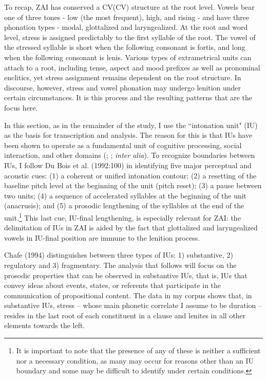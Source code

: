 To recap, ZAI has conserved a CV(CV) structure at the root level. Vowels bear one of three tones - low (the most frequent), high, and rising - and have three phonation types - modal, glottalized and laryngealized. At the root and word level, stress is assigned predictably to the first syllable of the root. The vowel of the stressed syllable is short when the following consonant is fortis, and long when the following consonant is lenis. Various types of extrametrical units can attach to a root, including tense, aspect and mood prefixes as well as pronominal enclitics, yet stress assignment remains dependent on the root structure. In discourse, however, stress and vowel phonation may undergo lenition under certain circumstances. It is this process and the resulting patterns that are the focus here.  

In this section, as in the remainder of the study, I use the ``intonation unit" (IU) \citep{chafe1994} as the basis for transcription and analysis. The reason for this is that IUs have been shown to operate as a fundamental unit of cognitive processing, social interaction, and other domains (\citealt{chafe1994}; \citealt{dubois1993}; \textit{inter alia}). To recognize boundaries between IUs, I follow Du Bois et al. (1992:100) in identifying five major perceptual and acoustic cues: (1) a coherent or unified intonation contour; (2) a resetting of the baseline pitch level at the beginning of the unit (pitch reset); (3) a pause between two units; (4) a sequence of accelerated syllables at the beginning of the unit (anacrusis); and (5) a prosodic lengthening of the syllables at the end of the unit.\footnote{It is important to note that the presence of any of these is neither a sufficient nor a necessary condition, as many may occur for reasons other than an IU boundary and some may be difficult to identify under certain conditions.} This last cue, IU-final lengthening, is especially relevant for ZAI: the delimitation of IUs in ZAI is aided by the fact that  glottalized and laryngealized vowels in IU-final position are immune to the lenition process.

Chafe (1994) distinguishes between three types of IUs: 1) substantive, 2) regulatory and 3) fragmentary. The analysis that follows will focus on the prosodic properties that can be observed in substantive IUs, that is, IUs that convey ideas about events, states, or referents that participate in the communication of propositional content. The data in my corpus shows that, in substantive IUs, stress -- whose main phonetic correlate I assume to be duration -- resides in the last root of each constituent in a clause and lenites in all other elements towards the left. 

